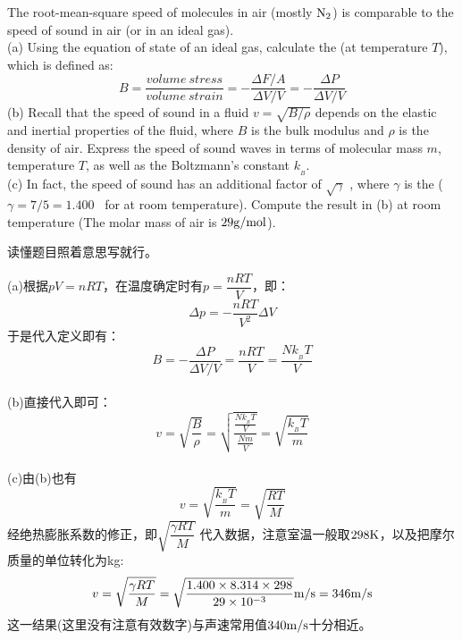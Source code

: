 \begin{solution}
    The root-mean-square
    speed of molecules in air (mostly $\rm{N_2}$) is comparable to
    the speed of sound in air (or in an ideal gas).\\
    (a) Using the equation of state of an ideal gas, calculate the  (at temperature $T$), which is defined as:
    \begin{equation*}
        B = \frac{volume \ stress}{volume \ strain} = -\frac{\Delta F/A}{\Delta V/V} = -\frac{\Delta P}{\Delta V/V}
    \end{equation*}
    (b) Recall that the speed of sound in a fluid $v=\sqrt{B/\rho}$ depends on
    the elastic and inertial properties of the fluid, where $B$ is the bulk
    modulus and $\rho$ is the density of air. Express the speed of sound
    waves in terms of molecular mass $m$, temperature $T$, as well as
    the Boltzmann's constant $k_{_B}$.\\
    (c) In fact, the speed of sound has an additional factor of $\sqrt{\gamma}$ ,
    where $\gamma$ is the  ($\gamma = 7/5 = 1.400$ \ for 
    at room temperature). Compute the result in (b) at room temperature (The molar
    mass of air is $29 \rm{g/mol}$).

    \tcbrule

    读懂题目照着意思写就行。

    (a)根据$pV=nRT$，在温度确定时有$p=\dfrac{nRT}{V}$，即：
    \begin{equation*}
        \Delta p = -\frac{nRT}{V^{2}}\Delta V
    \end{equation*}
    于是代入定义即有：
    \begin{equation*}
        B = -\frac{\Delta P}{\Delta V/V} = \frac{nRT}{V}=\frac{Nk_{_B}T}{V}
    \end{equation*}
    \\
    (b)直接代入即可：
    \begin{equation*}
        v=\sqrt{\frac{B}{\rho}}=\sqrt{\dfrac{\frac{Nk_{_B}T}{V}}{\frac{Nm}{V}}}=\sqrt{\frac{k_{_B}T}{m}}
    \end{equation*}
    \\
    (c)由(b)也有
    \[v=\sqrt{\frac{k_{_B}T}{m}}=\sqrt{\frac{RT}{M}}\]
    经绝热膨胀系数的修正，即$\sqrt{\dfrac{\gamma RT}{M}}$
    代入数据，注意室温一般取$298\rm{K}$，以及把摩尔质量的单位转化为kg:
    \begin{equation*}
        v=\sqrt{\frac{\gamma RT}{M}} =\sqrt{\frac{1.400\times8.314\times 298}{29\times 10^{-3}}}\rm{m/s} = 346\rm{m/s}
    \end{equation*}
    这一结果(这里没有注意有效数字)与声速常用值$340\rm{m/s}$十分相近。
\end{solution}

